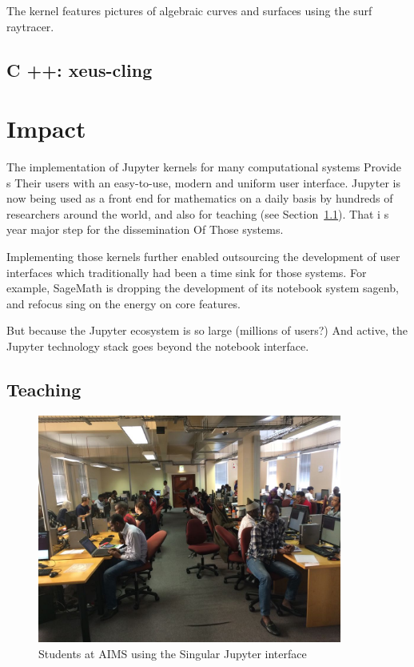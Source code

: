 \documentclass{deliverablereport}
\begin{document}
The \Singular{} kernel features pictures of algebraic curves and surfaces
using the surf raytracer.

\subsection {C ++: xeus-cling}

\section {Impact}

The implementation of Jupyter kernels for many computational systems
Provide s Their users with an easy-to-use, modern and uniform user interface.
Jupyter is now being used as a front end for mathematics on a daily basis by hundreds of researchers
around the world, and also for teaching (see Section~\ref{teaching}).
That i s year major step for the dissemination Of Those systems.

Implementing those kernels further enabled outsourcing the development of user interfaces
which traditionally had been a time sink for those systems.
For example, SageMath is dropping the development of its notebook system sagenb, and
refocus sing on the energy on core features. %

But because the Jupyter ecosystem is so large (millions of users?) And active,
the Jupyter technology stack goes beyond the notebook interface.


\subsection{Teaching}\label{teaching}

\begin{figure}\label{AIMS}
\includegraphics[width=100mm]{IMG-20180124-WA0000.jpg}
\caption{Students at AIMS using the Singular Jupyter interface}
\end{figure}
\end{document}
